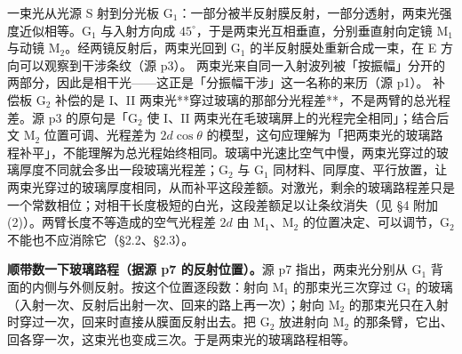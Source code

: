 \documentclass[11pt]{ctexart}
\newcommand{\Dl}{d}
\begin{document}


一束光从光源 S 射到分光板 G$_1$：一部分被半反射膜反射，一部分透射，两束光强度近似相等。G$_1$ 与入射方向成 $45^\circ$，于是两束光互相垂直，分别垂直射向定镜 M$_1$ 与动镜 M$_2$。经两镜反射后，两束光回到 G$_1$ 的半反射膜处重新合成一束，在 E 方向可以观察到干涉条纹（源 p3）。
两束光来自同一入射波列被「按振幅」分开的两部分，因此是相干光——这正是「分振幅干涉」这一名称的来历（源 p1）。
补偿板 G$_2$ 补偿的是 I、II 两束光**穿过玻璃的那部分光程差**，不是两臂的总光程差。源 p3 的原句是「G$_2$ 使 I、II 两束光在毛玻璃屏上的光程完全相同」；结合后文 M$_2$ 位置可调、光程差为 $2\Dl\cos\theta$ 的模型，这句应理解为「把两束光的玻璃路程补平」，不能理解为总光程始终相同。玻璃中光速比空气中慢，两束光穿过的玻璃厚度不同就会多出一段玻璃光程差；G$_2$ 与 G$_1$ 同材料、同厚度、平行放置，让两束光穿过的玻璃厚度相同，从而补平这段差额。对激光，剩余的玻璃路程差只是一个常数相位；对相干长度极短的白光，这段差额足以让条纹消失（见 §4 附加 (2)）。两臂长度不等造成的空气光程差 $2\Dl$ 由 M$_1$、M$_2$ 的位置决定、可以调节，G$_2$ 不能也不应消除它（§2.2、§2.3）。

\textbf{顺带数一下玻璃路程（据源 p7 的反射位置）。}源 p7 指出，两束光分别从 G$_1$ 背面的内侧与外侧反射。按这个位置逐段数：射向 M$_1$ 的那束光三次穿过 G$_1$ 的玻璃（入射一次、反射后出射一次、回来的路上再一次）；射向 M$_2$ 的那束光只在入射时穿过一次，回来时直接从膜面反射出去。把 G$_2$ 放进射向 M$_2$ 的那条臂，它出、回各穿一次，这束光也变成三次。于是两束光的玻璃路程相等。
\end{document}

